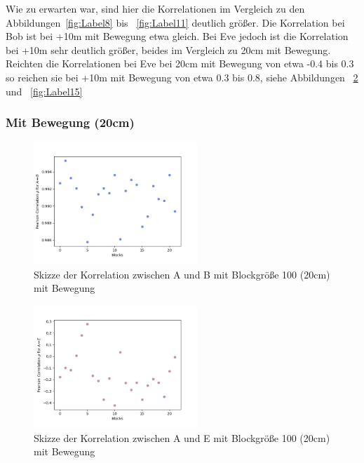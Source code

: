 \documentclass[12pt,a4paper]{article}
\begin{document}
Wie zu erwarten war, sind hier die Korrelationen im 
Vergleich zu den Abbildungen~\ref{fig:Label8} bis
~\ref{fig:Label11} deutlich größer. Die Korrelation bei 
Bob ist bei +10m mit Bewegung etwa gleich. Bei Eve jedoch ist 
die Korrelation bei +10m sehr deutlich größer, beides im 
Vergleich zu 20cm mit Bewegung. Reichten die 
Korrelationen bei Eve bei 20cm mit Bewegung von etwa 
-0.4 bis 0.3 so reichen sie bei +10m mit Bewegung von 
etwa 0.3 bis 0.8, siehe Abbildungen
~\ref{fig:Label13} und ~\ref{fig:Label15} 



\subsubsection*{Mit Bewegung (20cm)}


\begin{figure}[hbt!]
	\centering
		\includegraphics[width=0.55\textwidth ]
		{Bilder/a3-t3a-mb-block100-correlation-AB.png}
		\caption{Skizze der Korrelation zwischen A und B mit Blockgröße 100 (20cm) mit Bewegung}
		\label{fig:Label12}
\end{figure}

\begin{figure}[hbt!]
	\centering
		\includegraphics[width=0.55\textwidth ]
		{Bilder/a3-t3a-mb-block100-correlation-AE.png}
		\caption{Skizze der Korrelation zwischen A und E mit Blockgröße 100 (20cm) mit Bewegung}
		\label{fig:Label13}
\end{figure}
\clearpage
\end{document}
